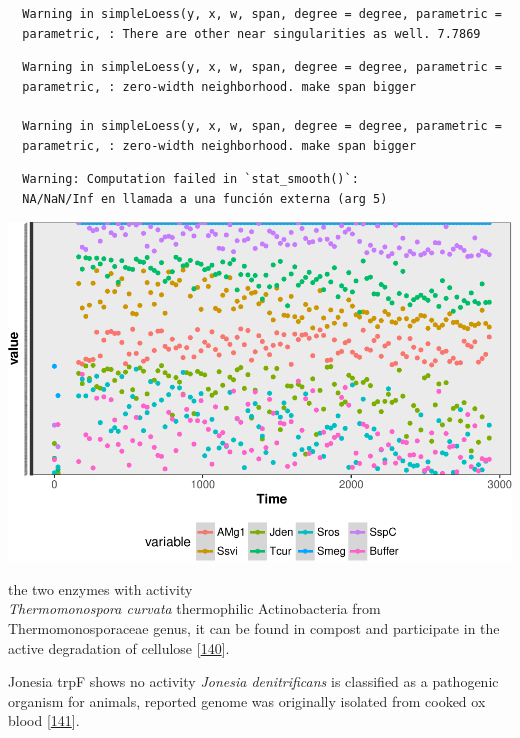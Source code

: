\documentclass[12pt,twoside]{reedthesis}
\begin{document}
  \begin{verbatim}
  Warning in simpleLoess(y, x, w, span, degree = degree, parametric =
  parametric, : There are other near singularities as well. 7.7869
  \end{verbatim}
  
  \begin{verbatim}
  Warning in simpleLoess(y, x, w, span, degree = degree, parametric =
  parametric, : zero-width neighborhood. make span bigger
  
  Warning in simpleLoess(y, x, w, span, degree = degree, parametric =
  parametric, : zero-width neighborhood. make span bigger
  \end{verbatim}
  
  \begin{verbatim}
  Warning: Computation failed in `stat_smooth()`:
  NA/NaN/Inf en llamada a una función externa (arg 5)
  \end{verbatim}
  
  \begin{center}\includegraphics{tesis_files/figure-latex/activity-4} \end{center}
  
  the two enzymes with activity\\
  \emph{Thermomonospora curvata} thermophilic Actinobacteria from
  Thermomonosporaceae genus, it can be found in compost and participate in
  the active degradation of cellulose
  {[}\protect\hyperlink{ref-chertkov_complete_2011}{140}{]}.
  
  Jonesia trpF shows no activity \emph{Jonesia denitrificans} is
  classified as a pathogenic organism for animals, reported genome was
  originally isolated from cooked ox blood
  {[}\protect\hyperlink{ref-pukall_complete_2009}{141}{]}.
  
\end{document}
